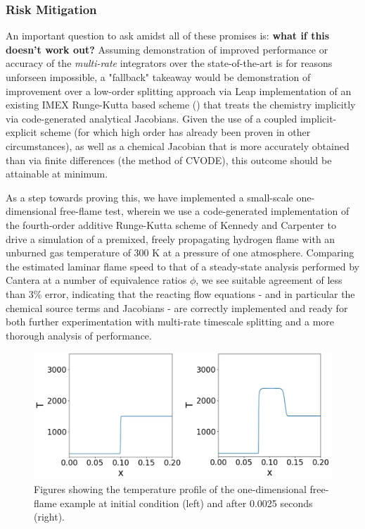 \subsubsection{Risk Mitigation}

An important question to ask amidst all of these promises is: 
\textbf{what if this doesn't work out?} Assuming demonstration of improved
performance or accuracy of the \emph{multi-rate} integrators over the
state-of-the-art is for reasons unforseen impossible, a "fallback" takeaway
would be demonstration of improvement over a low-order splitting
approach via Leap implementation of an existing IMEX Runge-Kutta based scheme
(\cite{kennedy2003additive}) that treats the chemistry implicitly via code-generated
analytical Jacobians. Given the use of a coupled implicit-explicit scheme
(for which high order has already been proven in other circumstances),
as well as a chemical Jacobian that is more accurately obtained than via finite
differences (the method of CVODE), this outcome should be attainable at minimum.

As a step towards proving this, we have implemented a small-scale one-dimensional
free-flame test, wherein we use a code-generated implementation of the fourth-order
additive Runge-Kutta scheme of Kennedy and Carpenter to drive a simulation of
a premixed, freely propagating hydrogen flame with an unburned gas temperature
of 300 K at a pressure of one atmosphere. Comparing the estimated laminar
flame speed to that of a steady-state analysis performed by Cantera at a number
of equivalence ratios $\phi$, we see suitable agreement of less than 3\% error, indicating
that the reacting flow equations - and in particular the chemical source terms and Jacobians -
are correctly implemented and ready for both further experimentation with multi-rate
timescale splitting and a more thorough analysis of performance.

\begin{figure}
\centering
\includegraphics[width=0.9\linewidth,trim=4 4 4 4,clip]{figures/flame_figures.png}
\caption{Figures showing the temperature profile of the one-dimensional free-flame example
         at initial condition (left) and after 0.0025 seconds (right).}
\label{fig:freeflame_output}
\end{figure}

